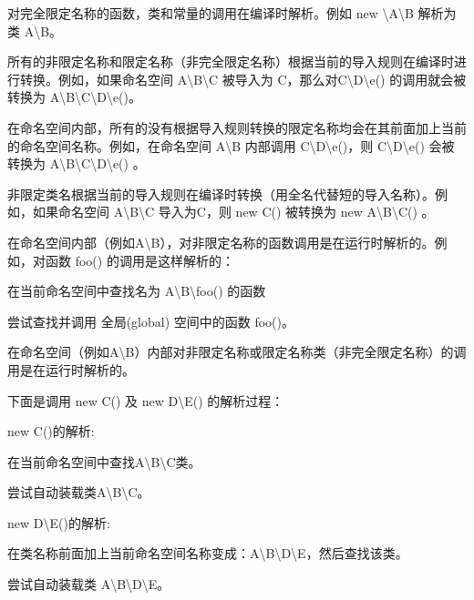 \begin{compactenum}
\item 对完全限定名称的函数，类和常量的调用在编译时解析。例如 new \textbackslash A\textbackslash B 解析为类 A\textbackslash B。
\item 所有的非限定名称和限定名称（非完全限定名称）根据当前的导入规则在编译时进行转换。例如，如果命名空间 A\textbackslash B\textbackslash C 被导入为 C，那么对C\textbackslash D\textbackslash e() 的调用就会被转换为 A\textbackslash B\textbackslash C\textbackslash D\textbackslash e()。
\item 在命名空间内部，所有的没有根据导入规则转换的限定名称均会在其前面加上当前的命名空间名称。例如，在命名空间 A\textbackslash B 内部调用 C\textbackslash D\textbackslash e()，则 C\textbackslash D\textbackslash e() 会被转换为 A\textbackslash B\textbackslash C\textbackslash D\textbackslash e() 。
\item 非限定类名根据当前的导入规则在编译时转换（用全名代替短的导入名称）。例如，如果命名空间 A\textbackslash B\textbackslash C 导入为C，则 new C() 被转换为 new A\textbackslash B\textbackslash C() 。
\item 在命名空间内部（例如A\textbackslash B），对非限定名称的函数调用是在运行时解析的。例如，对函数 foo() 的调用是这样解析的：
	\begin{compactenum}
	\item 在当前命名空间中查找名为 A\textbackslash B\textbackslash foo() 的函数
	\item 尝试查找并调用 全局(global) 空间中的函数 foo()。
	\end{compactenum}

\item 在命名空间（例如A\textbackslash B）内部对非限定名称或限定名称类（非完全限定名称）的调用是在运行时解析的。

下面是调用 new C() 及 new D\textbackslash E() 的解析过程：

	\begin{compactitem}
	\item new C()的解析:
		\begin{compactenum}
		\item 在当前命名空间中查找A\textbackslash B\textbackslash C类。
		\item 尝试自动装载类A\textbackslash B\textbackslash C。
		\end{compactenum}
	\item new D\textbackslash E()的解析:
		\begin{compactenum}
		\item 在类名称前面加上当前命名空间名称变成：A\textbackslash B\textbackslash D\textbackslash E，然后查找该类。
		\item 尝试自动装载类 A\textbackslash B\textbackslash D\textbackslash E。
		\end{compactenum}
\end{compactitem}

\end{compactenum}

